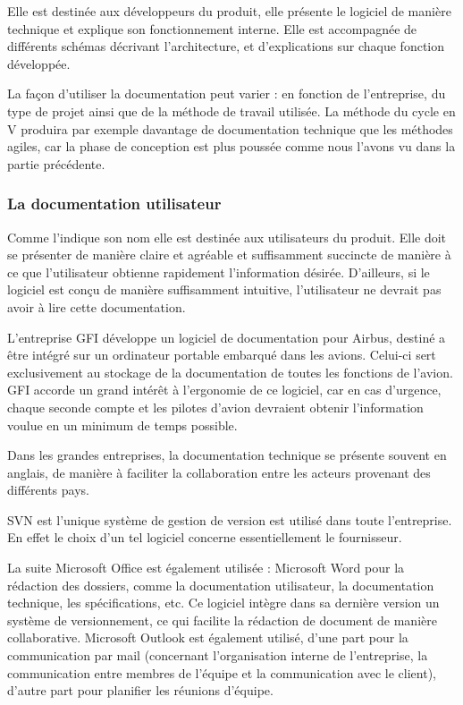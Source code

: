 Elle est destinée aux développeurs du produit, elle présente le logiciel de manière technique et explique son fonctionnement interne. Elle est accompagnée de différents schémas décrivant l'architecture, et d'explications sur chaque fonction développée.

La façon d'utiliser la documentation peut varier : en fonction de l'entreprise, du type de projet ainsi que de la méthode de travail utilisée. La méthode du cycle en V produira par exemple davantage de documentation technique que les méthodes agiles, car la phase de conception est plus poussée comme nous l'avons vu dans la partie précédente.

\subsubsection{La documentation utilisateur}

Comme l'indique son nom elle est destinée aux utilisateurs du produit. Elle doit se présenter de manière claire et agréable et suffisamment succincte de manière à ce que l'utilisateur obtienne rapidement l'information désirée.
D'ailleurs, si le logiciel est conçu de manière suffisamment intuitive, l'utilisateur ne devrait pas avoir à lire cette documentation.

\begin{app}
L'entreprise GFI développe un logiciel de documentation pour Airbus, destiné a être intégré sur un ordinateur portable embarqué dans les avions. Celui-ci sert exclusivement au stockage de la documentation de toutes les fonctions de l'avion. GFI accorde un grand intérêt à l'ergonomie de ce logiciel, car en cas d'urgence, chaque seconde compte et les pilotes d'avion devraient obtenir l'information voulue en un minimum de temps possible.
\end{app}

Dans les grandes entreprises, la documentation technique se présente souvent en anglais, de manière à faciliter la collaboration entre les acteurs provenant des différents pays.

\begin{app}
SVN est l'unique système de gestion de version est utilisé dans toute l'entreprise. En effet le choix d'un tel logiciel concerne essentiellement le fournisseur.

La suite Microsoft Office est également utilisée :
Microsoft Word pour la rédaction des dossiers, comme la documentation utilisateur, la documentation technique, les spécifications, etc. Ce logiciel intègre dans sa dernière version un système de versionnement, ce qui facilite la rédaction de document de manière collaborative.
Microsoft Outlook est également utilisé, d'une part pour la communication par mail (concernant l'organisation interne de l'entreprise, la communication entre membres de l'équipe et la communication avec le client), d'autre part pour planifier les réunions d'équipe.
\end{app}

